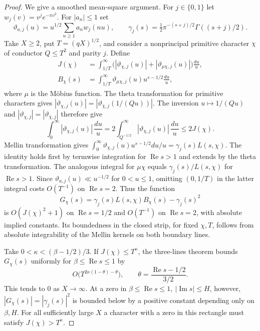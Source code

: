 \documentclass[11pt,reqno]{amsart}
\theoremstyle{definition}
\numberwithin{equation}{section}
\newcommand{\re}{\operatorname{Re}}
\newcommand{\im}{\operatorname{Im}}
\newcommand{\abs}[1]{\left|#1\right|}
\begin{document}
\begin{proof}
We give a smoothed mean-square argument. For \(j\in\{0,1\}\) let
\(w_j(v)=v^j e^{-\pi v^2}\). For \(|a_n|\le1\) set
\[
 \vartheta_{a,j}(u)=u^{1/2}\sum_{n\ge1}a_n w_j(nu),\qquad
 \gamma_j(s)=\tfrac12\pi^{-(s+j)/2}\Gamma((s+j)/2).
\]
Take \(X\ge2\), put \(T=(qX)^{1/2}\), and consider a nonprincipal
primitive character \(\chi\) of conductor \(Q\le T^2\) and parity \(j\).
Define
\[
 \begin{split}
 J(\chi)&=\int_{1/T}^\infty
    \bigl(|\vartheta_{\chi,j}(u)|+|\vartheta_{\mu\chi,j}(u)|\bigr)\frac{du}{u},\\
 B_\chi(s)&=\int_{1/T}^\infty
                \vartheta_{\mu\chi,j}(u)u^{s-1/2}\frac{du}{u},
 \end{split}
\]
where \(\mu\) is the M\"obius function. The theta transformation for
primitive characters gives
\(\abs{\vartheta_{\chi,j}(u)}
 =\abs{\vartheta_{\bar\chi,j}(1/(Qu))}\).
The inversion \(u\mapsto1/(Qu)\) and
\(\abs{\vartheta_{\chi,j}}=\abs{\vartheta_{\bar\chi,j}}\) therefore give
\[
 \int_0^\infty |\vartheta_{\chi,j}(u)|\,\frac{du}{u}
 =2\int_{Q^{-1/2}}^\infty|\vartheta_{\chi,j}(u)|\,\frac{du}{u}
 \le 2J(\chi).
\]
Mellin transformation gives
\(\int_0^\infty \vartheta_{\chi,j}(u)u^{s-1/2}du/u=\gamma_j(s)L(s,\chi)\).
The identity holds first by termwise integration for \(\re s>1\) and
extends by the theta transformation. The analogous integral for
\(\mu\chi\) equals \(\gamma_j(s)/L(s,\chi)\) for \(\re s>1\).
Since \(\vartheta_{a,j}(u)\ll u^{-1/2}\) for \(0<u\le1\), omitting
\((0,1/T)\) in the latter integral costs \(O(T^{-1})\) on \(\re s=2\).
Thus the function
\[
 G_\chi(s)=\gamma_j(s)L(s,\chi)B_\chi(s)-\gamma_j(s)^2
\]
is \(O(J(\chi)^2+1)\) on \(\re s=1/2\) and \(O(T^{-1})\) on
\(\re s=2\), with absolute implied constants. Its boundedness in the
closed strip, for fixed \(\chi,T\), follows from absolute integrability of
the Mellin kernels on both boundary lines.

Take \(0<\kappa<(\beta-1/2)/3\). If \(J(\chi)\le T^\kappa\), the
three-lines theorem bounds \(G_\chi(s)\) uniformly for
\(\beta\le\re s\le1\) by
\[
 O\bigl(T^{2\kappa(1-\theta)-\theta}\bigr),
 \qquad \theta=\frac{\re s-1/2}{3/2}.
\]
This tends to \(0\) as \(X\to\infty\). At a zero in
\(\beta\le\re s\le1,\ |\im s|\le H\), however,
\(\abs{G_\chi(s)}=\abs{\gamma_j(s)}^2\) is bounded below by a positive
constant depending only on \(\beta,H\). For all sufficiently large \(X\)
a character with a zero in this rectangle must satisfy \(J(\chi)>T^\kappa\).


\end{proof}
\end{document}
